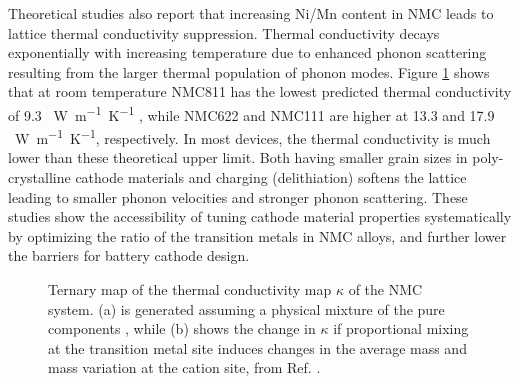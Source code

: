 \documentclass[aps,prb,twocolumn,superscriptaddress,reprint]{revtex4-1}
\begin{document}
Theoretical studies also report that increasing Ni/Mn content in NMC leads to lattice thermal conductivity suppression.\cite{yang2020chemical} Thermal conductivity decays exponentially with increasing temperature due to enhanced phonon scattering resulting from the larger thermal population of phonon modes. Figure \ref{figure_kappa} shows that at room temperature NMC811 has the lowest predicted thermal conductivity of 9.3 \SI{}{W.m^{-1}.K^{-1}} , while NMC622 and NMC111 are higher at 13.3 and 17.9 \SI{}{W.m^{-1}.K^{-1}}, respectively. In most devices, the thermal conductivity is much lower than these theoretical upper limit.\cite{takahata2002thermal,chen2006thermal} Both having smaller grain sizes  in poly-crystalline cathode materials and charging (delithiation) softens the lattice leading to smaller phonon velocities and stronger phonon scattering. \cite{feng2020quantum,xia2020high} These studies show the accessibility of tuning cathode material properties systematically by optimizing the ratio of the transition metals in NMC alloys, and further lower the barriers for battery cathode design.

\begin{figure}[]
  \centering
    \caption{Ternary map of the thermal conductivity map $\kappa$ of the NMC system. (a) is generated assuming a physical mixture of the pure components , while (b) shows the change in $\kappa$ if proportional mixing at the transition metal site induces changes in the average mass and mass variation at the cation site, from Ref. . }
  \label{figure_kappa}
\end{figure}
\end{document}
